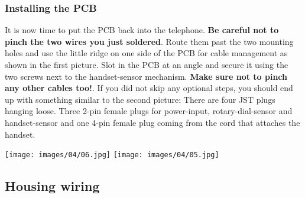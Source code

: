 \documentclass[]{article}
\begin{document}
\subsubsection{Installing the PCB}
\begin{minipage}[t]{0.4\linewidth}
	\vspace{0pt}
	It is now time to put the PCB back into the telephone. \textbf{Be careful not to pinch the two wires you just soldered}. Route them past the two mounting holes and use the little ridge on one side of the PCB for cable management as shown in the first picture.
	\newline
	\newline
	Slot in the PCB at an angle and secure it using the two screws next to the handset-sensor mechanism. \textbf{Make sure not to pinch any other cables too!}. If you did not skip any optional steps, you should end up with something similar to the second picture: There are four JST plugs hanging loose. Three 2-pin female plugs for power-input, rotary-dial-sensor and handset-sensor and one 4-pin female plug coming from the cord that attaches the handset.
\end{minipage}
\hfill
\begin{minipage}[t]{0.5\linewidth}
	\vspace{0pt}
	\texttt{[image: images/04/06.jpg]}
	\texttt{[image: images/04/05.jpg]}
\end{minipage}




\subsection{Housing wiring}
\end{document}
